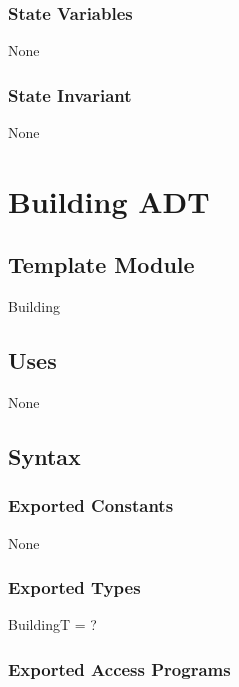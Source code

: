 \documentclass[12pt]{article}
\begin{document}
\subsubsection* {State Variables}

None

\subsubsection* {State Invariant}

None

\newpage

\section* {Building ADT}

\subsection*{Template Module}

Building

\subsection* {Uses}

None

\subsection* {Syntax}

\subsubsection* {Exported Constants}

None

\subsubsection* {Exported Types}

BuildingT = ?

\subsubsection* {Exported Access Programs}
\end{document}
